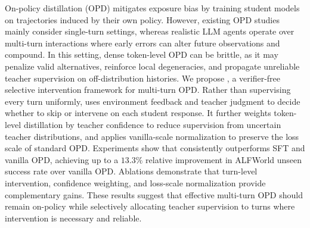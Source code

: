 On-policy distillation (OPD) mitigates exposure bias by training student models on trajectories induced by their own policy.
%
However, existing OPD studies mainly consider single-turn settings, whereas realistic LLM agents operate over multi-turn interactions where early errors can alter future observations and compound.
%
In this setting, dense token-level OPD can be brittle, as it may penalize valid alternatives, reinforce local degeneracies, and propagate unreliable teacher supervision on off-distribution histories.
%
We propose \textbf{\ours{}}, a verifier-free selective intervention framework for multi-turn OPD.
%
Rather than supervising every turn uniformly, \ours{} uses environment feedback and teacher judgment to decide whether to skip or intervene on each student response.
%
It further weights token-level distillation by teacher confidence to reduce supervision from uncertain teacher distributions, and applies vanilla-scale normalization to preserve the loss scale of standard OPD.
%
Experiments show that \ours{} consistently outperforms SFT and vanilla OPD, achieving up to a $13.3\%$ relative improvement in ALFWorld unseen success rate over vanilla OPD.
%
Ablations demonstrate that turn-level intervention, confidence weighting, and loss-scale normalization provide complementary gains.
%
These results suggest that effective multi-turn OPD should remain on-policy while selectively allocating teacher supervision to turns where intervention is necessary and reliable.